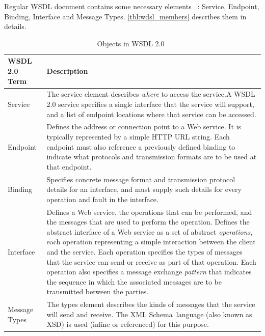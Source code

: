 Regular WSDL document contains some necessary elements
~\cite{wsdl_language_spec, wikipedia:WSDL}: Service, Endpoint, Binding,
Interface and Message Types. \autoref{tbl:wdsl_members} describes them in
details.


\begin{table}[h]
	\centering	
	\caption{Objects in WSDL 2.0~\cite{wsdl_language_spec, wikipedia:WSDL} }
	\label{tbl:wdsl_members}
	\begin{tabular}[h]{|l|p{10cm}|}
		\hline
		\textbf{WSDL 2.0 Term} & 
		\textbf{Description} 	
	    	\tabularnewline
		\hline
			Service &
			The service element describes \textit{where} to access the service.\newline A
			WSDL 2.0 service specifies a single interface that the service will support,
			and a list of endpoint locations where that service can be accessed.
	    	\tabularnewline	    	
	    	\hline
			Endpoint & 
			Defines the address or connection point to a Web service.
			It is typically represented by a simple HTTP URL string.			
			Each endpoint must also reference a previously defined binding to indicate			
			what protocols and transmission formats are to be used at that endpoint.				
	    	\tabularnewline

	    	\hline
			Binding &		
			Specifies concrete message format and transmission protocol details			 
			for an interface, and must supply such details for every operation			 
			and fault in the interface.
	    	\tabularnewline

	    	\hline
			Interface &
			Defines a Web service, the operations that can be performed,			
			and the messages that are used to perform the operation.			
			Defines the abstract interface of a Web service as a set of abstract \textit{operations},			
			each operation representing a simple interaction between the client and the service.			
			Each operation specifies the types of messages that the service can send or receive as part of that operation.			
			Each operation also specifies a message exchange \textit{pattern} that indicates the sequence in which the associated messages are to be transmitted between the parties. 
	    	\tabularnewline

		\hline
			Message Types &
			The types element describes the kinds of messages that the service will send and receive.			
			The XML Schema\footnotemark ~language (also known as XSD) is used (inline or
			referenced) for this purpose.
	    	\tabularnewline
		\hline	  
	\end{tabular} 
\end{table}
 
